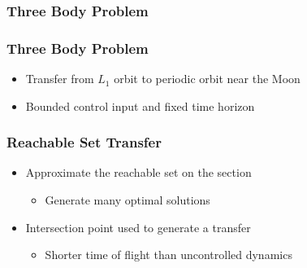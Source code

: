 \subsubsection[Circular Restricted Three Body Problem]{Three Body Problem}

\begin{frame}%
\frametitle{Three Body Problem}
    \begin{itemize}
        \item Transfer from \( L_1 \) orbit to periodic orbit near the Moon
        \item Bounded control input and fixed time horizon
    \end{itemize}
    
\end{frame} %

\begin{frame}%
    \frametitle{Reachable Set Transfer}
    \begin{itemize}
        \item Approximate the reachable set on the \Poincare section
        \begin{itemize}
            \item Generate many optimal solutions
        \end{itemize}
        \item<3-> Intersection point used to generate a transfer
        \begin{itemize}
            \item Shorter time of flight than uncontrolled dynamics
        \end{itemize}
    \end{itemize}
    \begin{center}
    \end{center}
    
\end{frame} %

